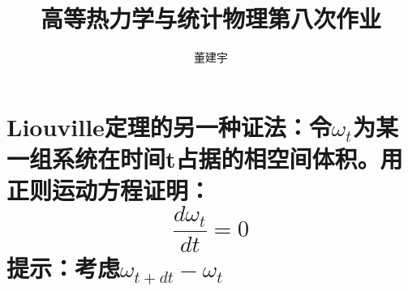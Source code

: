 \documentclass[reqno,a4paper,12pt]{amsart}
\title{高等热力学与统计物理第八次作业}
\author{董建宇}
\begin{document}
\maketitle

\titleformat{\section}[hang]{\small}{\thesection}{0.8em}{}{}
\titleformat{\subsection}[hang]{\small}{\thesubsection}{0.8em}{}{}

\section{Liouville定理的另一种证法：令$\omega_t$为某一组系统在时间t占据的相空间体积。用正则运动方程证明：
\[
	\frac{d\omega_t}{dt} = 0
\]
提示：考虑$\omega_{t+dt} - \omega_t$
}
\end{document}
